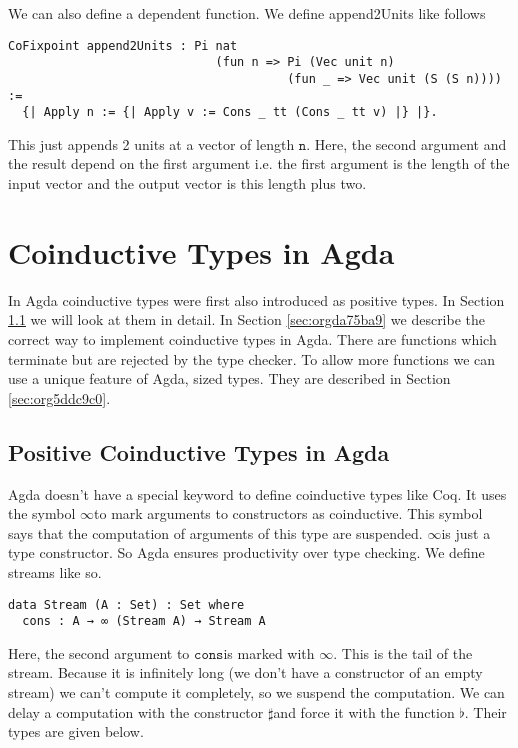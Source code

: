 \documentclass[a4paper,cleardoubleempty,BCOR1cm]{scrbook}
\begin{document}
We can also define a dependent function.  We define append2Units like
follows
\begin{verbatim}
CoFixpoint append2Units : Pi nat
                             (fun n => Pi (Vec unit n)
                                       (fun _ => Vec unit (S (S n)))) :=
  {| Apply n := {| Apply v := Cons _ tt (Cons _ tt v) |} |}.
\end{verbatim}
This just appends 2 units at a vector of length $\mathtt{n}$.  Here, the second
argument and the result depend on the first argument i.e. the first argument
is the length of the input vector and the output vector is this length plus
two.

\section{Coinductive Types in Agda}
\label{sec:org9447cd3}
In Agda coinductive types were first also introduced as positive types. In
Section \ref{sec:org6e1a082} we will look at them in
detail. In Section \ref{sec:orgda75ba9} we describe the correct
way to implement coinductive types in Agda. There are functions which
terminate but are rejected by the type checker.   To allow more functions we can use a unique feature of Agda, sized
types. They are described in Section \ref{sec:org5ddc9c0}.

\subsection{Positive Coinductive Types in Agda}
\label{sec:org6e1a082}
Agda doesn't have a special keyword to define coinductive types like Coq.  It
uses the symbol $\mathtt{\infty}$\;to mark arguments to constructors as coinductive.
This symbol says that the computation of arguments of this type are suspended.
$\mathtt{\infty}$\;is just a type constructor.  So Agda ensures productivity over type
checking. We define streams like so.

\begin{verbatim}
data Stream (A : Set) : Set where
  cons : A → ∞ (Stream A) → Stream A
\end{verbatim}

Here, the second argument to $\mathtt{cons}$\;is marked with $\mathtt{\infty}$. This is the tail of
the stream. Because it is infinitely long (we don't have a constructor of an
empty stream) we can't compute it completely, so we suspend the computation.
We can delay a computation with the constructor $\mathtt{\sharp}$\;and force it with
the function $\mathtt{\flat}$. Their types are given below.
\end{document}
